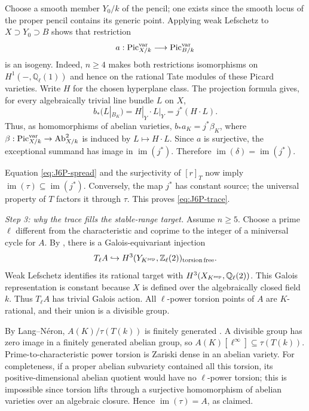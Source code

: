 Choose a smooth member $Y_0/k$ of the pencil; one exists since
the smooth locus of the proper pencil contains its generic point.
Applying weak Lefschetz to $X\supset Y_0\supset B$ shows that
restriction
\[
 a:\operatorname{Pic}^{\rm var}_{X/k}
       \longrightarrow\operatorname{Pic}^{\rm var}_{B/k}
\]
is an isogeny. Indeed, $n\geq4$ makes both restrictions
isomorphisms on $H^1(-,\mathbb Q_\ell(1))$ and hence on the
rational Tate modules of these Picard varieties. Write $H$ for
the chosen hyperplane class. The projection formula gives,
for every algebraically trivial line bundle $L$ on $X$,
\[
 b_*(L|_{B_K})=H|_Y\cdot L|_Y=j^*(H\cdot L).
\]
Thus, as homomorphisms of abelian varieties,
$b_*a_K=j^*\beta_K$, where
$\beta:\operatorname{Pic}^{\rm var}_{X/k}\to
\operatorname{Ab}^2_{X/k}$ is induced by $L\mapsto H\cdot L$.
Since $a$ is surjective, the exceptional summand has image in
$\operatorname{im}(j^*)$. Therefore
$\operatorname{im}(\delta)=\operatorname{im}(j^*)$.

Equation \eqref{eq:J6P-spread} and the surjectivity of $[r]_T$
now imply $\operatorname{im}(\tau)\subseteq\operatorname{im}(j^*)$.
Conversely, the map $j^*$ has constant source; the universal
property of $T$ factors it through $\tau$. This proves
\eqref{eq:J6P-trace}.

\emph{Step 3: why the trace fills the stable-range target.}
Assume $n\geq5$. Choose a prime $\ell$ different from the
characteristic and coprime to the integer of a miniversal cycle
for $A$. By \cite[Proposition 8.2, p.~31]{DGJ_ACMVFunctor}, there
is a Galois-equivariant injection
\[
 T_\ell A\hookrightarrow H^3(Y_{K^{\rm sep}},\mathbb Z_\ell(2))_{
 \rm torsion\,free}.
\]
Weak Lefschetz identifies its rational target with
$H^3(X_{K^{\rm sep}},\mathbb Q_\ell(2))$. This Galois
representation is constant because $X$ is defined over the
algebraically closed field $k$. Thus $T_\ell A$ has trivial
Galois action. All $\ell$-power torsion points of $A$ are
$K$-rational, and their union is a divisible group.

By Lang--N\'eron,
$A(K)/\tau(T(k))$ is finitely generated
\cite[Theorem 7.1, p.~23]{DGJ_Conrad2006}. A divisible group
has zero image in a finitely generated abelian group, so
$A(K)[\ell^\infty]\subseteq\tau(T(k))$. Prime-to-characteristic
power torsion is Zariski dense in an abelian variety. For
completeness, if a proper abelian subvariety contained all this
torsion, its positive-dimensional abelian quotient would have
no $\ell$-power torsion; this is impossible since torsion lifts
through a surjective homomorphism of abelian varieties over an
algebraic closure. Hence $\operatorname{im}(\tau)=A$, as claimed.

